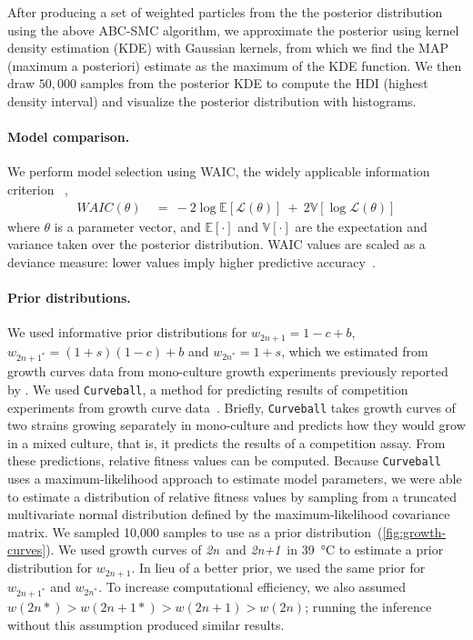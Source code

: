 \documentclass[12pt]{extarticle}
\newcommand{\likelihood}{\mathcal{L}}
\newcommand{\euwt}{\emph{2n}}
\newcommand{\anwt}{\emph{2n+1}}
\begin{document}
After producing a set of weighted particles from the the posterior distribution using the above ABC-SMC algorithm, we approximate the posterior using kernel density estimation (KDE) with Gaussian kernels, from which we find the MAP (maximum a posteriori) estimate as the maximum of the KDE function. We then draw $50,000$ samples from the posterior KDE to compute the HDI (highest density interval) and visualize the posterior distribution with histograms.


\paragraph{Model comparison.} We perform model selection using WAIC, the widely applicable information criterion ~\citep{gelman2013bayesian},
\begin{equation} \label{eq:WAIC}
\begin{aligned}
\mathit{WAIC}(\theta) &\ =\ 
-2\log\mathbb{E}[\likelihood(\theta)]\ +\ 2\mathbb{V}[\log\likelihood(\theta)]
\end{aligned}
\end{equation}
where $\theta$ is a parameter vector, and $\mathbb{E}[\cdot]$ and $\mathbb{V}[\cdot]$ are the expectation and variance taken over the posterior distribution.
WAIC values are scaled as a deviance measure: lower values imply higher predictive accuracy~\citep{Kass1995}.
 
\paragraph{Prior distributions.} We used informative prior distributions for $w_{2n+1}=1-c+b$, $w_{2n+1^*}=(1+s)(1-c)+b$ and $w_{2n^*}=1+s$, which we estimated from growth curves data from mono-culture growth experiments previously reported by \citet[Figs. 3C, 4A, and S2]{Yona2012}.
We used \texttt{Curveball}, a method for predicting results of competition experiments from growth curve data~\citep[\href{https://curveball.yoavram.com}{curveball.yoavram.com}]{Ram2019}. Briefly, \texttt{Curveball} takes growth curves of two strains growing separately in mono-culture and predicts how they would grow in a mixed culture, that is, it predicts the results of a competition assay.
From these predictions, relative fitness values can be computed. Because \texttt{Curveball} uses a maximum-likelihood approach to estimate model parameters, we were able to estimate a distribution of relative fitness values by sampling from a truncated multivariate normal distribution defined by the maximum-likelihood covariance matrix. We sampled 10,000 samples to use as a prior distribution~(\autoref{fig:growth-curves}).
We used growth curves of \euwt\ and \anwt\ in \SI{39}{\celsius} to estimate a prior distribution for $w_{2n+1}$. In lieu of a better prior, we used the same prior for $w_{2n+1^*}$ and $w_{2n^*}$. 
To increase computational efficiency, we also assumed $w(2n*)>w(2n+1*)>w(2n+1)>w(2n)$; running the inference without this assumption produced similar results. 
\end{document}
